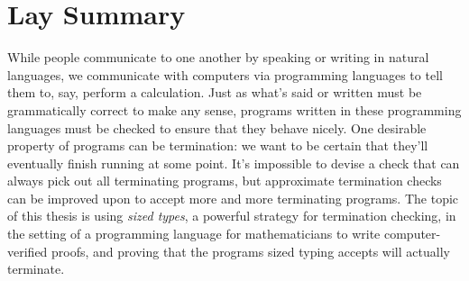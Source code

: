 \chapter{Lay Summary}

While people communicate to one another by speaking or writing in natural languages,
we communicate with computers via programming languages to tell them to, say, perform a calculation.
Just as what's said or written must be grammatically correct to make any sense,
programs written in these programming languages must be checked to ensure that they behave nicely.
One desirable property of programs can be termination:
we want to be certain that they'll eventually finish running at some point.
It's impossible to devise a check that can always pick out all terminating programs,
but approximate termination checks can be improved upon to accept more and more terminating programs.
The topic of this thesis is using \emph{sized types}, a powerful strategy for termination checking,
in the setting of a programming language for mathematicians to write computer-verified proofs,
and proving that the programs sized typing accepts will actually terminate.